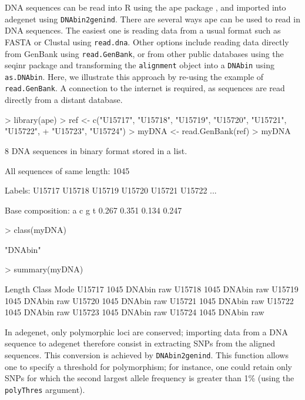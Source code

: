 \documentclass{article}
\begin{document}
DNA sequences can be read into R using the ape package \cite{tj527}, and
imported into adegenet using \texttt{DNAbin2genind}.
There are several ways ape can be used to read in DNA sequences.
The easiest one is reading data from a usual format such as FASTA or Clustal using \texttt{read.dna}.
Other options include reading data directly from GenBank using \texttt{read.GenBank}, or from other
public databases using the seqinr package and transforming the \texttt{alignment} object into a
\texttt{DNAbin} using \texttt{as.DNAbin}.
Here, we illustrate this approach by re-using the example of \texttt{read.GenBank}. A connection to
the internet is required, as sequences are read directly from a distant database.
\begin{Schunk}
\begin{Sinput}
> library(ape)
> ref <- c("U15717", "U15718", "U15719", "U15720", "U15721", "U15722", 
+     "U15723", "U15724")
> myDNA <- read.GenBank(ref)
> myDNA
\end{Sinput}
\begin{Soutput}
8 DNA sequences in binary format stored in a list.

All sequences of same length: 1045 

Labels: U15717 U15718 U15719 U15720 U15721 U15722 ...

Base composition:
    a     c     g     t 
0.267 0.351 0.134 0.247 
\end{Soutput}
\begin{Sinput}
> class(myDNA)
\end{Sinput}
\begin{Soutput}
[1] "DNAbin"
\end{Soutput}
\begin{Sinput}
> summary(myDNA)
\end{Sinput}
\begin{Soutput}
       Length Class  Mode
U15717 1045   DNAbin raw 
U15718 1045   DNAbin raw 
U15719 1045   DNAbin raw 
U15720 1045   DNAbin raw 
U15721 1045   DNAbin raw 
U15722 1045   DNAbin raw 
U15723 1045   DNAbin raw 
U15724 1045   DNAbin raw 
\end{Soutput}
\end{Schunk}
In adegenet, only polymorphic loci are conserved; importing data from a DNA sequence to adegenet
therefore consist in extracting SNPs from the aligned sequences.
This conversion is achieved by \texttt{DNAbin2genind}.
This function allows one to specify a threshold for polymorphism; for instance, one could retain
only SNPs for which the second largest allele frequency is greater than 1\% (using the \texttt{polyThres} argument).
\end{document}
